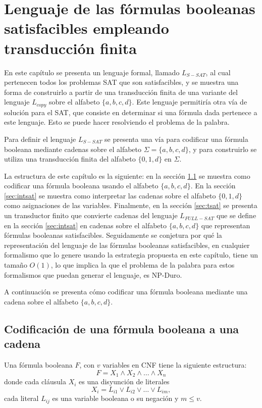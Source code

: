 \chapter{Lenguaje de las fórmulas booleanas satisfacibles empleando transducción finita}
\label{chap:LSATFT}

En este capítulo se presenta  un lenguaje formal, llamado $L_{S-SAT}$, al cual pertenecen todos los problemas
SAT que son satisfacibles, y se muestra una forma de construirlo a partir de una transducción finita de una variante
del lenguaje $L_{copy}$ sobre el alfabeto $\{a,b,c,d\}$. Este lenguaje
permitiría otra vía de solución para el SAT, que consiste en determinar si una fórmula dada pertenece a este
lenguaje. Esto se puede hacer resolviendo el problema de la palabra.

Para definir el lenguaje $L_{S-SAT}$ se presenta una vía para codificar una fórmula booleana mediante cadenas
sobre el alfabeto $\Sigma=\{a, b,c,d\}$, y para construirlo se utiliza una transducción finita del
alfabeto $\{0,1,d\}$ en $\Sigma$.

La estructura de este capítulo es la siguiente: en la sección \ref{sec:codsat} se muestra como codificar
una fórmula booleana usando el alfabeto $\{a,b,c,d\}$. En la sección \ref{sec:intsat} se muestra como interpretar
las cadenas sobre el alfabeto $\{0,1,d\}$ como asignaciones de las variables. Finalmente, en la sección \ref{sec:tsat}
se presenta un transductor finito que convierte cadenas del lenguaje $L_{FULL-SAT}$ que se define en la sección \ref{sec:intsat}
en cadenas sobre el alfabeto $\{a,b,c,d\}$ que representan fórmulas booleanas satisfacibles. Seguidamente se
conjetura por qué la representación del lenguaje de las fórmulas booleanas satisfacibles, en
cualquier formalismo que lo genere usando la estrategia propuesta en este capítulo, tiene un tamaño $O(1)$,
lo que implica la que el problema de la palabra para estos formalismos que puedan generar el lenguaje, es NP-Duro.


A continuación se presenta cómo codificar una fórmula booleana mediante una cadena sobre el alfabeto $\{a,b,c,d\}$.

\section{Codificación de una fórmula booleana a una cadena}
\label{sec:codsat}

Una fórmula booleana $F$, con $v$ variables en CNF tiene la siguiente estructura:
$$F=X_1 \wedge X_2 \wedge \ldots \wedge X_n$$
donde cada cláusula $X_i$ es una disyunción de literales
$$X_i=L_{i1} \vee L_{i2} \vee \ldots \vee L_{im},$$
cada literal $L_{ij}$ es una variable booleana o su negación y $m\leq v$.

